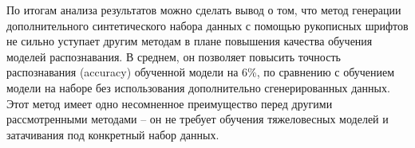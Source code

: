 По итогам анализа результатов можно сделать вывод о том, что метод генерации дополнительного синтетического набора данных с
помощью рукописных шрифтов не сильно уступает другим методам в плане повышения качества обучения моделей распознавания.
В среднем, он позволяет повысить точность распознавания (accuracy) обученной модели на 6\%,
по сравнению с обучением модели на наборе без использования дополнительно сгенерированных данных.
Этот метод имеет одно несомненное преимущество перед другими рассмотренными методами --
он не требует обучения тяжеловесных моделей и затачивания под конкретный набор данных.
